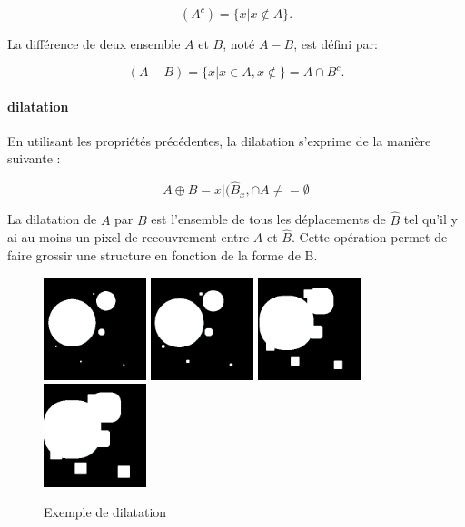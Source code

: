\begin{equation}
  (A^c) = \{x|x \not\in A\}. 
\end{equation}

La différence de deux ensemble $A$ et $B$, noté $A - B$, est défini par:

\begin{equation}
  (A-B) = \{x|x \in A, x\not\in \} = A \cap B^c.  
\end{equation}


\paragraph{dilatation}
En utilisant les propriétés précédentes, la dilatation s'exprime de la manière suivante :

\begin{equation}
 A \oplus B = {x|(\widehat{B}_x, \cap A \neq = \emptyset }
\end{equation}

La dilatation de $A$ par $B$ est l'ensemble de tous les déplacements de $\widehat{B}$ tel qu'il y ai au moins un pixel de recouvrement entre $A$ et $\widehat{B}$. Cette opération permet de faire grossir une structure en fonction de la forme de B.

\begin{figure}
  \centering
  \includegraphics[height=3cm]{Images/morpho_init.png}
  \includegraphics[height=3cm]{Images/morpho_dilate_k5.png}
  \includegraphics[height=3cm]{Images/morpho_dilate_k21.png}
  \includegraphics[height=3cm]{Images/morpho_dilate_k31.png}
  \label{fig:morpho_dilation}
  \caption{Exemple de dilatation}
\end{figure}

